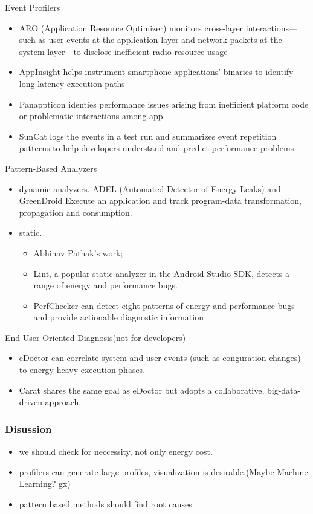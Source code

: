 Event Profilers
\begin{itemize}
\item ARO (Application Resource Optimizer) monitors cross-layer
  interactions—such as user events at the application layer and network packets
  at the system layer—to disclose inefficient radio resource usage
\item AppInsight helps instrument smartphone applications’ binaries to identify
  long latency execution paths
\item Panappticon identies performance issues arising from inefficient platform
  code or problematic interactions among app.
\item SunCat logs the events in a test run and summarizes event repetition
  patterns to help developers understand and predict performance problems
\end{itemize}

Pattern-Based Analyzers
\begin{itemize}
\item dynamic analyzers. ADEL (Automated Detector of Energy Leaks) and
  GreenDroid Execute an application and track program-data transformation,
  propagation and consumption.
\item static.
  \begin{itemize}
  \item 
    Abhinav Pathak's work;
  \item Lint, a popular static analyzer in the Android Studio SDK, detects a
    range of energy and performance bugs.
  \item PerfChecker can detect eight patterns of energy and performance bugs and
    provide actionable diagnostic information
  \end{itemize}
\end{itemize}

End-User-Oriented Diagnosis(not for developers)
\begin{itemize}
\item eDoctor can correlate system and user events (such as conguration changes)
  to energy-heavy execution phases.
\item Carat shares the same goal as eDoctor but adopts a collaborative,
  big-data-driven approach.
\end{itemize}

\subsubsection{Disussion}
\begin{itemize}
\item we should check for neccessity, not only energy cost.
\item profilers can generate large profiles, visualization is desirable.(Maybe
  Machine Learning? gx)
\item pattern based methods should find root causes.
\end{itemize}


